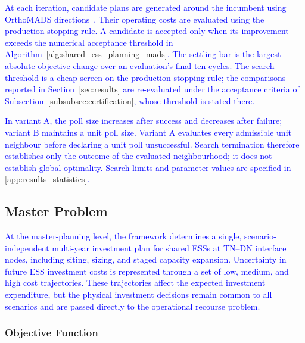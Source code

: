 \documentclass[preprint,12pt]{elsarticle}
\begin{document}
\textcolor{blue}{
    At each iteration, candidate plans are generated around the incumbent using OrthoMADS directions~\cite{abramson_orthomads_2009}.
    Their operating costs are evaluated using the production stopping rule. A candidate is accepted only when its improvement exceeds the numerical acceptance threshold in Algorithm~\ref{alg:shared_ess_planning_mads}. The settling bar is the largest absolute objective change over an evaluation's final ten cycles. The search threshold is a cheap screen on the production stopping rule; the comparisons reported in Section~\ref{sec:results} are re-evaluated under the acceptance criteria of Subsection~\ref{subsubsec:certification}, whose threshold is stated there.
}

\textcolor{blue}{
    In variant A, the poll size increases after success and decreases after failure; variant B maintains a unit poll size.
    Variant A evaluates every admissible unit neighbour before declaring a unit poll unsuccessful. Search termination therefore establishes only the outcome of the evaluated neighbourhood; it does not establish global optimality. Search limits and parameter values are specified in \ref{app:results_statistics}.
}

\subsection{Master Problem}
\label{subsec:master}

\textcolor{blue}{At the master-planning level, the framework determines a single, scenario-independent multi-year investment plan for shared ESSs at TN–DN interface nodes, including siting, sizing, and staged capacity expansion. Uncertainty in future ESS investment costs is represented through a set of low, medium, and high cost trajectories. These trajectories affect the expected investment expenditure, but the physical investment decisions remain common to all scenarios and are passed directly to the operational recourse problem.}

\subsubsection{Objective Function}
\end{document}
